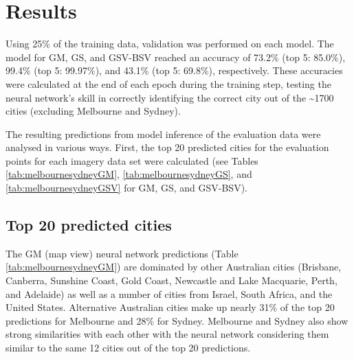 \documentclass[Crown,sageh,times]{sagej}
\begin{document}
\section{Results}\label{sec:results}

Using 25\% of the training data, validation was performed on each model. The model for GM, GS, and GSV-BSV reached an accuracy of 73.2\% (top 5: 85.0\%), 99.4\% (top 5: 99.97\%), and 43.1\% (top 5: 69.8\%), respectively. These accuracies were calculated at the end of each epoch during the training step, testing the neural network's skill in correctly identifying the correct city out of the \textasciitilde 1700 cities (excluding Melbourne and Sydney).

The resulting predictions from model inference of the evaluation data were analysed in various ways. First, the top 20 predicted cities for the evaluation points for each imagery data set were calculated (see Tables \ref{tab:melbournesydneyGM}, \ref{tab:melbournesydneyGS}, and \ref{tab:melbournesydneyGSV} for GM, GS, and GSV-BSV).

\subsection{Top 20 predicted cities} 

The GM (map view) neural network predictions (Table \ref{tab:melbournesydneyGM}) are dominated by other Australian cities (Brisbane, Canberra, Sunshine Coast, Gold Coast, Newcastle and Lake Macquarie, Perth, and Adelaide) as well as a number of cities from Israel, South Africa, and the United States. Alternative Australian cities make up nearly 31\% of the top 20 predictions for Melbourne and 28\% for Sydney. Melbourne and Sydney also show strong similarities with each other with the neural network considering them similar to the same 12 cities out of the top 20 predictions.
\end{document}
